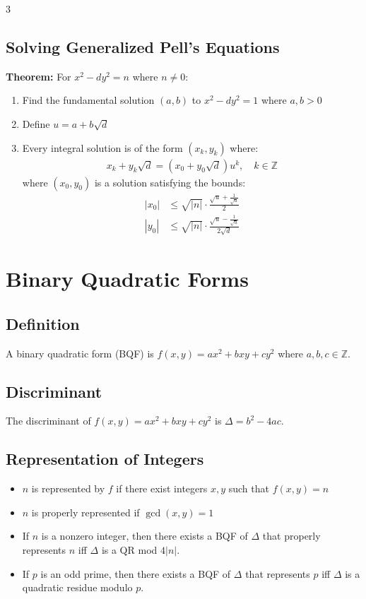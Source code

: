 \documentclass[8,a4paper]{article}
\begin{document}
\begin{multicols}{3}
	\subsection{Solving Generalized Pell's Equations}
	\textbf{Theorem:} For $x^2 - dy^2 = n$ where $n \neq 0$:
	\begin{enumerate}
		\item Find the fundamental solution $(a, b)$ to $x^2 - dy^2 = 1$ where $a, b > 0$
		\item Define $u = a + b\sqrt{d}$
		\item Every integral solution is of the form $(x_k, y_k)$ where:
		      \begin{align*}
			      x_k + y_k\sqrt{d} = (x_0 + y_0\sqrt{d})u^k, \quad k \in \mathbb{Z}
		      \end{align*}
		      where $(x_0, y_0)$ is a solution satisfying the bounds:
		      \begin{align*}
			      |x_0| & \leq \sqrt{|n|}\cdot\frac{\sqrt{u} + \frac{1}{\sqrt{u}}}{2}         \\
			      |y_0| & \leq \sqrt{|n|}\cdot\frac{\sqrt{u} - \frac{1}{\sqrt{u}}}{2\sqrt{d}}
		      \end{align*}
	\end{enumerate}

	\section{Binary Quadratic Forms}

	\subsection{Definition}
	A binary quadratic form (BQF) is $f(x,y) = ax^2 + bxy + cy^2$ where $a,b,c \in \mathbb{Z}$.

	\subsection{Discriminant}
	The discriminant of $f(x,y) = ax^2 + bxy + cy^2$ is $\Delta = b^2 - 4ac$.

	\subsection{Representation of Integers}
	\begin{itemize}[leftmargin=*]
		\item $n$ is represented by $f$ if there exist integers $x,y$ such that $f(x,y) = n$
		\item $n$ is properly represented if $\gcd(x,y) = 1$
		\item  If $n$ is a nonzero integer, then there exists a BQF of $\Delta$ that properly represents $n$ iff $\Delta$ is a QR mod $4|n|$.
		\item  If $p$ is an odd prime, then there exists a BQF of $\Delta$ that represents $p$ iff $\Delta$ is a quadratic residue modulo $p$.
	\end{itemize}


\end{multicols}
\end{document}
